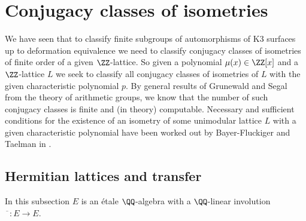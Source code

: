 %
%
%
\section{Conjugacy classes of isometries}\label{ConjAlg}
We have seen that to classify finite subgroups of automorphisms of K3 surfaces up to deformation equivalence we need to classify conjugacy classes of isometries of finite order of a given $\ZZ$-lattice.
So given a polynomial $\mu(x) \in \ZZ[x]$ and a $\ZZ$-lattice $L$
we seek to classify all conjugacy classes of isometries of $L$ with the given characteristic polynomial $p$.
By general results of Grunewald and Segal \cite[Cor. 1]{grunewald:conjugacy} from the theory of arithmetic groups, we know that the number of such conjugacy classes is finite and (in theory) computable.
Necessary and sufficient conditions for the existence of an isometry of some unimodular lattice $L$ with a given characteristic polynomial have been worked out by Bayer-Fluckiger and Taelman in \cite{fluckiger20,fluckiger21,fluckiger21b}.

\subsection{Hermitian lattices and transfer}\label{transfer}
In this subsection $E$ is an \'etale $\QQ$-algebra with a $\QQ$-linear involution $\overline{\phantom{x}}\colon E \to E$.

